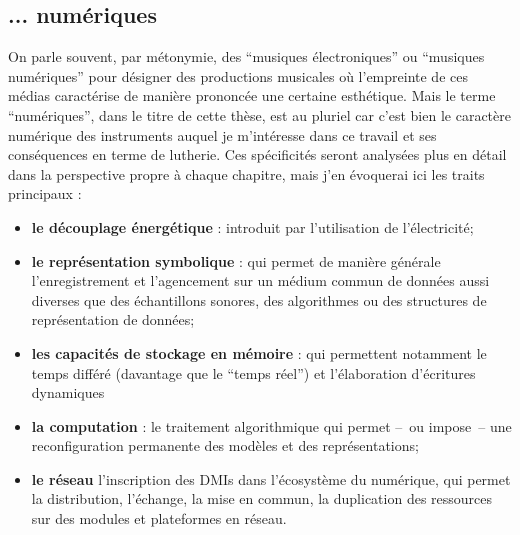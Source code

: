 \subsection*{... numériques}

\indent On parle souvent, par métonymie, des ``musiques électroniques'' ou ``musiques numériques'' pour désigner des productions musicales où l'empreinte de ces médias caractérise de manière prononcée une certaine esthétique. Mais le terme ``numériques'', dans le titre de cette thèse, est au pluriel car c'est bien le caractère numérique des instruments auquel je m'intéresse dans ce travail et ses conséquences en terme de lutherie. Ces spécificités seront analysées plus en détail dans la perspective propre à chaque chapitre, mais j'en évoquerai ici les traits principaux :
\vspace{-1em}
\begin{itemize}[noitemsep]
\item \textbf{le découplage énergétique} : introduit par l'utilisation de l'électricité;
\item \textbf{le représentation symbolique} : qui permet de manière générale l'enregistrement et l'agencement sur un médium commun de données aussi diverses que des échantillons sonores, des algorithmes ou des structures de représentation de données;
\item \textbf{les capacités de stockage en mémoire} : qui permettent notamment le temps différé (davantage que le ``temps réel'') et l'élaboration d'écritures dynamiques 
\item \textbf{la computation} : le traitement algorithmique qui permet --~ou impose~-- une reconfiguration permanente des modèles et des représentations;
\item \textbf{le réseau} l'inscription des \glspl{DMI} dans l'écosystème du numérique, qui permet la distribution, l'échange, la mise en commun, la duplication des ressources sur des modules et plateformes en réseau.
\end{itemize}


